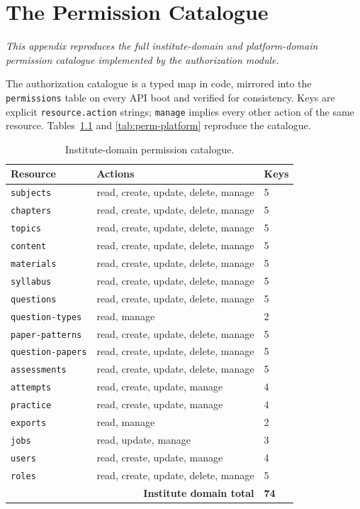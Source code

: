\chapter{The Permission Catalogue}
\label{app:permissions}

\begin{center}
\textit{This appendix reproduces the full institute-domain and platform-domain
permission catalogue implemented by the authorization module.}
\end{center}

\vspace*{\fill}
\clearpage
\noindent The authorization catalogue is a typed map in code, mirrored into
the \texttt{permissions} table on every API boot and verified for consistency.
Keys are explicit \texttt{resource.action} strings; \texttt{manage} implies
every other action of the same resource. Tables~\ref{tab:perm-institute} and
\ref{tab:perm-platform} reproduce the catalogue.

\begin{table}[htbp]
\centering
\small
\begin{tabular}{@{}p{3.7cm}p{7.7cm}p{2.3cm}@{}}
\toprule
\textbf{Resource} & \textbf{Actions} & \textbf{Keys} \\
\midrule
\texttt{subjects} & read, create, update, delete, manage & 5 \\
\texttt{chapters} & read, create, update, delete, manage & 5 \\
\texttt{topics} & read, create, update, delete, manage & 5 \\
\texttt{content} & read, create, update, delete, manage & 5 \\
\texttt{materials} & read, create, update, delete, manage & 5 \\
\texttt{syllabus} & read, create, update, delete, manage & 5 \\
\texttt{questions} & read, create, update, delete, manage & 5 \\
\texttt{question-types} & read, manage & 2 \\
\texttt{paper-patterns} & read, create, update, delete, manage & 5 \\
\texttt{question-papers} & read, create, update, delete, manage & 5 \\
\texttt{assessments} & read, create, update, delete, manage & 5 \\
\texttt{attempts} & read, create, update, manage & 4 \\
\texttt{practice} & read, create, update, manage & 4 \\
\texttt{exports} & read, manage & 2 \\
\texttt{jobs} & read, update, manage & 3 \\
\texttt{users} & read, create, update, manage & 4 \\
\texttt{roles} & read, create, update, delete, manage & 5 \\
\midrule
\multicolumn{2}{r}{\textbf{Institute domain total}} & \textbf{74} \\
\bottomrule
\end{tabular}
\caption{Institute-domain permission catalogue.}
\label{tab:perm-institute}
\end{table}

